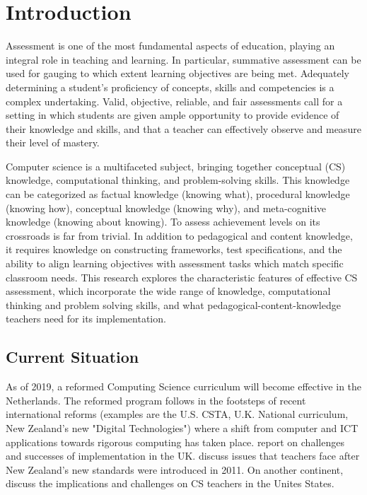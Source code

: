 \section{Introduction}\label{sec:intro}
Assessment is one of the most fundamental aspects of education, playing an integral role in teaching and learning. In particular, summative assessment can be used for gauging to which extent learning objectives are being met. Adequately determining a student's proficiency of concepts, skills and competencies is a complex undertaking. Valid, objective, reliable, and fair assessments call for a setting in which students are given ample opportunity to provide evidence of their knowledge and skills, and that a teacher can effectively observe and measure their level of mastery.

Computer science is a multifaceted subject, bringing together conceptual (CS) knowledge, computational thinking, and problem-solving skills. This knowledge can be categorized as factual knowledge (knowing what), procedural knowledge (knowing how), conceptual knowledge (knowing why), and meta-cognitive knowledge (knowing about knowing)\cite{streun2001kennis}. To assess achievement levels on its crossroads is far from trivial. In addition to pedagogical and content knowledge, it requires knowledge on constructing frameworks, test specifications, and the ability to align learning objectives with assessment tasks which match specific classroom needs. This research explores the characteristic features of effective CS assessment, which incorporate the wide range of knowledge, computational thinking and problem solving skills, and what pedagogical-content-knowledge teachers need for its implementation.

\subsection{Current Situation}


As of 2019, a reformed Computing Science curriculum will become effective in the Netherlands. The reformed program follows in the footsteps of recent international reforms (examples are the U.S. CSTA, U.K. National curriculum, New Zealand's new "Digital Technologies") where a shift from computer and ICT applications towards rigorous computing has taken place.  report on challenges and successes of implementation in the UK.  discuss issues that teachers face after New Zealand's new standards were introduced in 2011. On another continent,  discuss the implications and challenges on CS teachers in the Unites States.

